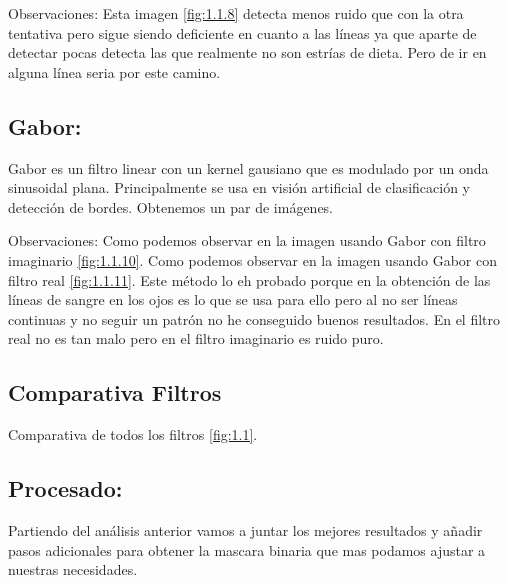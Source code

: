 Observaciones:
Esta imagen \ref{fig:1.1.8} detecta menos ruido que con la otra tentativa pero sigue siendo deficiente en cuanto a las líneas ya que aparte de detectar pocas detecta las que realmente no son estrías de dieta. Pero de ir en alguna línea seria por este camino.



\subsection{Gabor:}

Gabor \cite{wiki:Gabor} es un filtro linear con un kernel gausiano  que es modulado por un onda sinusoidal plana. Principalmente se usa en visión artificial de clasificación y detección de bordes.
Obtenemos un par de imágenes.



Observaciones:
Como podemos observar en la imagen usando Gabor con filtro imaginario \ref{fig:1.1.10}.
Como podemos observar en la imagen usando Gabor con filtro real \ref{fig:1.1.11}.
Este método lo eh probado porque en la obtención de las líneas de sangre en los ojos es lo que se usa para ello pero al no ser líneas continuas y no seguir un patrón no he conseguido buenos resultados. En el filtro real no es tan malo pero en el filtro imaginario es ruido puro.
\subsection{Comparativa Filtros}
Comparativa de todos los filtros \ref{fig:1.1}. 

\subsection{Procesado:}
Partiendo del análisis anterior vamos a juntar los mejores resultados y añadir pasos adicionales para obtener la mascara binaria que mas podamos ajustar a nuestras necesidades.


